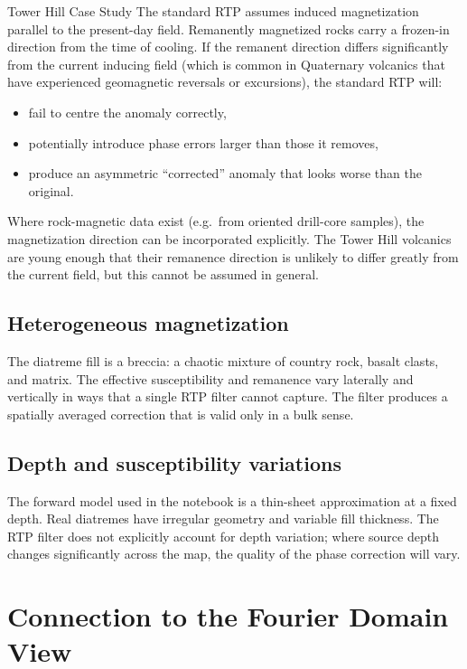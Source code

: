 \begin{activity}{Tower Hill Case Study}
The standard RTP assumes induced magnetization parallel to the present-day
field.
Remanently magnetized rocks carry a frozen-in direction from the time of
cooling.
If the remanent direction differs significantly from the current inducing
field (which is common in Quaternary volcanics that have experienced
geomagnetic reversals or excursions), the standard RTP will:
\begin{itemize}
  \item fail to centre the anomaly correctly,
  \item potentially introduce phase errors larger than those it removes,
  \item produce an asymmetric ``corrected'' anomaly that looks worse than the
        original.
\end{itemize}
Where rock-magnetic data exist (e.g.\ from oriented drill-core samples),
the magnetization direction can be incorporated explicitly.
The Tower Hill volcanics are young enough that their remanence direction
is unlikely to differ greatly from the current field, but this cannot be
assumed in general.

\subsection{Heterogeneous magnetization}

The diatreme fill is a breccia: a chaotic mixture of country rock, basalt
clasts, and matrix.
The effective susceptibility and remanence vary laterally and vertically
in ways that a single RTP filter cannot capture.
The filter produces a spatially averaged correction that is valid only in
a bulk sense.

\subsection{Depth and susceptibility variations}

The forward model used in the notebook is a thin-sheet approximation at
a fixed depth.
Real diatremes have irregular geometry and variable fill thickness.
The RTP filter does not explicitly account for depth variation;
where source depth changes significantly across the map, the quality of the
phase correction will vary.

\section{Connection to the Fourier Domain View}


\end{activity}
